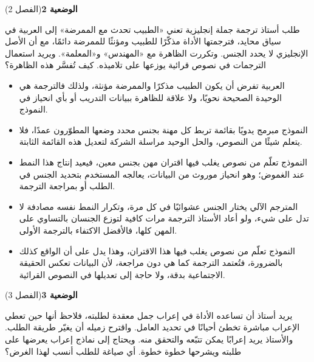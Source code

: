 \documentclass[11pt,a4paper]{article}
\begin{document}
\par\vspace{6pt}
\noindent
{\large\khatt\textbf{الوضعية 2}}\hfill{\small(الفصل 2)}\par\nopagebreak\vspace{3pt}
\setlength{\fboxsep}{7pt}\colorbox{gray!10}{\parbox{\dimexpr\linewidth-14pt}{طلب أستاذ ترجمة جملة إنجليزية تعني «الطبيب تحدث مع الممرضة» إلى العربية في سياق محايد، فترجمتها الأداة مذكّرًا للطبيب ومؤنثًا للممرضة دائمًا، مع أن الأصل الإنجليزي لا يحدد الجنس. وتكررت الظاهرة مع «المهندس» و«المعلمة». ويريد استعمال الترجمات في نصوص قرائية يوزعها على تلاميذه. كيف تُفسَّر هذه الظاهرة؟}}\par\nopagebreak
\begin{itemize}[leftmargin=1.0cm, labelsep=6pt, itemsep=3pt, topsep=4pt, parsep=0pt]
  \item[\textbf{أ)}] العربية تفرض أن يكون الطبيب مذكرًا والممرضة مؤنثة، ولذلك فالترجمة هي الوحيدة الصحيحة نحويًا، ولا علاقة للظاهرة ببيانات التدريب أو بأي انحياز في النموذج.
  \item[\textbf{ب)}] النموذج مبرمج يدويًا بقائمة تربط كل مهنة بجنس محدد وضعها المطوّرون عمدًا، فلا يتعلم شيئًا من النصوص، والحل الوحيد مراسلة الشركة لتعديل هذه القائمة الثابتة.
  \item[\textbf{ج)}] النموذج تعلّم من نصوص يغلب فيها اقتران مهن بجنس معين، فيعيد إنتاج هذا النمط عند الغموض؛ وهو انحياز موروث من البيانات، يعالجه المستخدم بتحديد الجنس في الطلب أو بمراجعة الترجمة.
  \item[\textbf{د)}] المترجم الآلي يختار الجنس عشوائيًا في كل مرة، وتكرار النمط نفسه مصادفة لا تدل على شيء، ولو أعاد الأستاذ الترجمة مرات كافية لتوزع الجنسان بالتساوي على المهن كلها، فالأفضل الاكتفاء بالترجمة الأولى.
  \item[\textbf{هـ)}] النموذج تعلّم من نصوص يغلب فيها هذا الاقتران، وهذا يدل على أن الواقع كذلك بالضرورة، فتُعتمد الترجمة كما هي دون مراجعة، لأن البيانات تعكس الحقيقة الاجتماعية بدقة، ولا حاجة إلى تعديلها في النصوص القرائية.
\end{itemize}
\par\vspace{6pt}
\noindent
{\large\khatt\textbf{الوضعية 3}}\hfill{\small(الفصل 3)}\par\nopagebreak\vspace{3pt}
\setlength{\fboxsep}{7pt}\colorbox{gray!10}{\parbox{\dimexpr\linewidth-14pt}{يريد أستاذ أن تساعده الأداة في إعراب جمل معقدة لطلبته، فلاحظ أنها حين تعطي الإعراب مباشرة تخطئ أحيانًا في تحديد العامل. واقترح زميله أن يغيّر طريقة الطلب. والأستاذ يريد إعرابًا يمكن تتبّعه والتحقق منه. ويحتاج إلى نماذج إعراب يعرضها على طلبته ويشرحها خطوة خطوة. أي صياغة للطلب أنسب لهذا الغرض؟}}\par\nopagebreak
\end{document}
